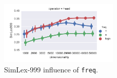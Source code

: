 \begin{figure}[h]
  \centering

  \includegraphics[width=0.5\textwidth]{supplement/figures/SimLex999-interaction-freq}

  \caption{SimLex-999 influence of \texttt{freq}.}
  \label{fig:SimLex999-freq}
\end{figure}

